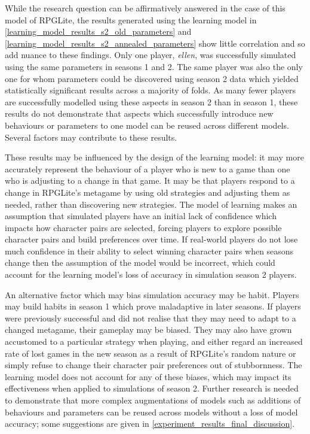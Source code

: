 While the research question can be affirmatively answered in the case of this
model of RPGLite, the results generated using the learning model in
\cref{learning_model_results_s2_old_parameters} and
\cref{learning_model_results_s2_annealed_parameters} show little correlation and
so add nuance to these findings. Only one player, \emph{ellen}, was successfully
simulated using the same parameters in seasons 1 and 2. The same player was also
the only one for whom parameters could be discovered using season 2 data which
yielded statistically significant results across a majority of folds. As many
fewer players are successfully modelled using these aspects in season 2 than in
season 1, these results do not demonstrate that aspects which successfully
introduce new behaviours or parameters to one model can be reused across
different models. Several factors may contribute to these results.

These results may be influenced by the design of the learning model: it may more
accurately represent the behaviour of a player who is new to a game than one who
is adjusting to a change in that game. It may be that players respond to a
change in RPGLite's metagame by using old strategies and adjusting them as
needed, rather than discovering new strategies. The model of learning makes an
assumption that simulated players have an initial lack of confidence which
impacts how character pairs are selected, forcing players to explore possible
character pairs and build preferences over time. If real-world players do not
lose much confidence in their ability to select winning character pairs when
seasons change then the assumption of the model would be incorrect, which could
account for the learning model's loss of accuracy in simulation season 2
players.

An alternative factor which may bias simulation accuracy may be habit. Players
may build habits in season 1 which prove maladaptive in later seasons. If
players were previously successful and did not realise that they may need to
adapt to a changed metagame, their gameplay may be biased. They may also have
grown accustomed to a particular strategy when playing, and either regard an
increased rate of lost games in the new season as a result of RPGLite's random
nature or simply refuse to change their character pair preferences out of
stubbornness. The learning model does not account for any of these biases, which
may impact its effectiveness when applied to simulations of season 2. Further
research is needed to demonstrate that more complex augmentations of models such
as additions of behaviours and parameters can be reused across models without a
loss of model accuracy; some suggestions are given in
\cref{experiment_results_final_discussion}.

